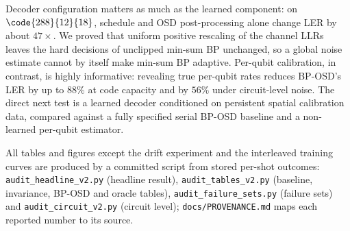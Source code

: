 Decoder configuration matters as much as the learned component: on
$\code{288}{12}{18}$, schedule and OSD post-processing alone change LER by
about $47\times$. We proved that uniform positive rescaling of the channel
LLRs leaves the hard decisions of unclipped min-sum BP unchanged, so a
global noise estimate cannot by itself make min-sum BP adaptive. Per-qubit
calibration, in contrast, is highly informative: revealing true per-qubit
rates reduces BP-OSD's LER by up to $88\%$ at code capacity and by $56\%$
under circuit-level noise. The direct next test is a learned decoder
conditioned on persistent spatial calibration data, compared against a
fully specified serial BP-OSD baseline and a non-learned per-qubit
estimator.

All tables and figures except the drift experiment and the interleaved
training curves are produced by a committed script from stored
per-shot outcomes: \texttt{audit\_headline\_v2.py} (headline result),
\texttt{audit\_tables\_v2.py} (baseline, invariance, BP-OSD and oracle
tables), \texttt{audit\_failure\_sets.py} (failure sets) and
\texttt{audit\_circuit\_v2.py} (circuit level); \texttt{docs/PROVENANCE.md}
maps each reported number to its source.
